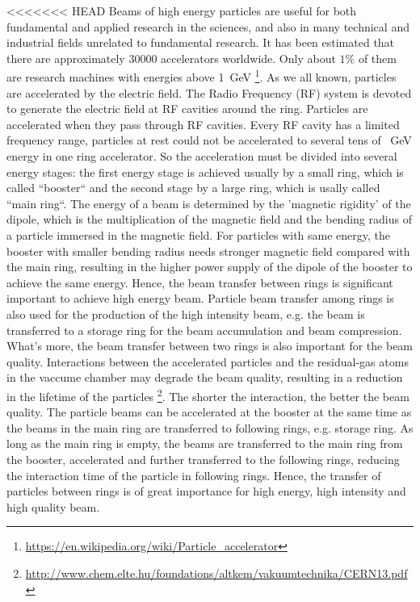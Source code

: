 %

<<<<<<< HEAD
Beams of high energy particles are useful for both fundamental and applied research in the sciences, and also in many technical and industrial fields unrelated to fundamental research. It has been estimated that there are approximately 30000 accelerators worldwide. Only about $1\%$ of them are research machines with energies above \SI{1}{GeV} \footnote{\url{https://en.wikipedia.org/wiki/Particle_accelerator}}.  As we all known, particles are accelerated by the electric field. The Radio Frequency (RF) system is devoted to generate the electric field at RF cavities around the ring. Particles are accelerated when they pass through RF cavities. Every RF cavity has a limited frequency range,  particles at rest could not be accelerated to several tens of \SI{}{GeV} energy in one ring accelerator.  So the acceleration must be divided into several energy stages: the first energy stage is achieved usually by a small ring, which is called ``booster`` and the second stage by a large ring, which is usally called ``main ring``.  The energy of a beam is determined by the 'magnetic rigidity' of the dipole, which is the multiplication of the magnetic field and the bending radius of a particle immersed in the magnetic field. For particles with same energy, the booster with smaller bending radius needs stronger magnetic field compared with the main ring, resulting in the higher power supply of the dipole of the booster to achieve the same energy. Hence, the beam transfer between rings is significant important to achieve high energy beam. Particle beam transfer among rings is also used for the production of the high intensity beam, e.g. the beam is transferred to a storage ring for the beam accumulation and beam compression. What's more, the beam transfer between two rings is also important for the beam quality. Interactions between the accelerated particles and the residual-gas atoms in the vaccume chamber may degrade the beam quality, resulting in a reduction in the lifetime of the particles \footnote{\url{http://www.chem.elte.hu/foundations/altkem/vakuumtechnika/CERN13.pdf}}. The shorter the interaction, the better the beam quality. The particle beams can be accelerated at the booster at the same time as the beams in the main ring are transferred to following rings, e.g. storage ring. As long as the main ring is empty, the beams are transferred to the main ring from the booster, accelerated and further transferred to the following rings, reducing the interaction time of the particle in following rings. Hence, the transfer of particles between rings is of great importance for high energy, high intensity and high quality beam.
